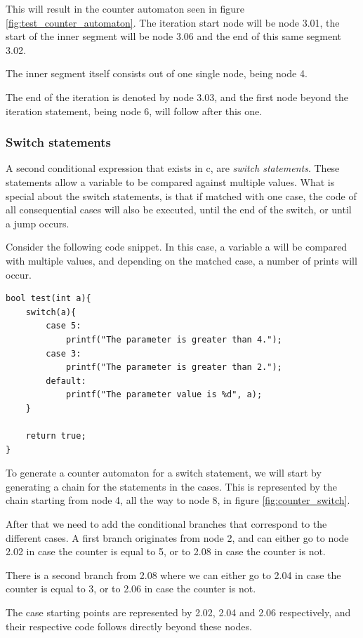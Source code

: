 \documentclass[12pt]{article}
\begin{document}
This will result in the counter automaton seen in figure \ref{fig:test_counter_automaton}. The iteration start node will be node 3.01, the start of the inner segment will be node 3.06 and the end of this same segment 3.02.

The inner segment itself consists out of one single node, being node 4.

The end of the iteration is denoted by node 3.03, and the first node beyond the iteration statement, being node 6, will follow after this one.

\subsubsection{Switch statements}
A second conditional expression that exists in c, are \textit{switch statements}. These statements allow a variable to be compared against multiple values. What is special about the switch statements, is that if matched with one case, the code of all consequential cases will also be executed, until the end of the switch, or until a jump occurs.

Consider the following code snippet. In this case, a variable a will be compared with multiple values, and depending on the matched case, a number of prints will occur.

\begin{lstlisting}[style=CStyle]
bool test(int a){
	switch(a){
		case 5:
			printf("The parameter is greater than 4.");
		case 3:
			printf("The parameter is greater than 2.");
		default:
			printf("The parameter value is %d", a);
	}
	
	return true;
}
\end{lstlisting}

To generate a counter automaton for a switch statement, we will start by generating a chain for the statements in the cases. This is represented by the chain starting from node 4, all the way to node 8, in figure \ref{fig:counter_switch}.

After that we need to add the conditional branches that correspond to the different cases. A first branch originates from node 2, and can either go to node 2.02 in case the counter is equal to 5, or to 2.08 in case the counter is not.

There is a second branch from 2.08 where we can either go to 2.04 in case the counter is equal to 3, or to 2.06 in case the counter is not.

The case starting points are represented by 2.02, 2.04 and 2.06 respectively, and their respective code follows directly beyond these nodes.
\end{document}
